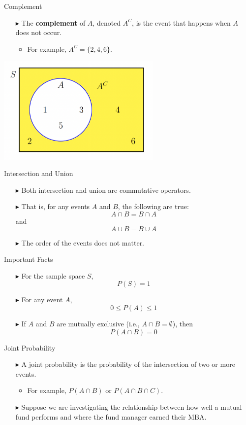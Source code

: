 \documentclass[12pt]{beamer}
\begin{document}
\begin{frame}{Complement}
	\begin{itemize}
		\item[$\blacktriangleright$] The {\bf complement} of $A$, denoted $A^C$, is the event that happens when $A$ does not occur.
		\begin{itemize}
			\item For example, $A^C=\{2,4,6\}$.
		\end{itemize}
	\end{itemize}
	\centering
	\includegraphics[width=8cm]{venn4.png}
\end{frame}
\begin{frame}{Intersection and Union}
	\begin{itemize}
		\item[$\blacktriangleright$] Both intersection and union are commutative operators.
		\item[$\blacktriangleright$] That is, for any events $A$ and $B$, the following are true:
$$A\cap B=B\cap A$$ and $$A\cup B=B\cup A$$
\item[$\blacktriangleright$]The order of the events does not matter.
	\end{itemize}
\end{frame}
\begin{frame}{Important Facts}
	\begin{itemize}
		\item[$\blacktriangleright$] For the sample space $S$,
		$$P(S)=1$$
		\item[$\blacktriangleright$] For any event $A$,
		$$0\le P(A)\le1$$
		\item[$\blacktriangleright$]If $A$ and $B$ are mutually exclusive (i.e., $A\cap B=\emptyset$), then $$P(A\cap B)=0$$
	\end{itemize}
\end{frame}
\begin{frame}{Joint Probability}
	\begin{itemize}
		\item[$\blacktriangleright$] A joint probability is the probability of the intersection of two or more events.
		\begin{itemize}
			\item For example, $P(A\cap B)$ or $P(A\cap B\cap C)$.
		\end{itemize}
		\item[$\blacktriangleright$] Suppose we are investigating the relationship between how well a mutual fund performs and where the fund manager earned their MBA.
	\end{itemize}
\end{frame}
\end{document}
